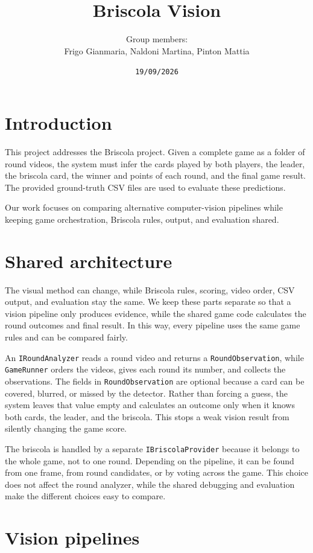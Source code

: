 \documentclass[11pt,a4paper]{article}
\title{Briscola Vision}
\author{Group members: \\ Frigo Gianmaria, Naldoni Martina, Pinton Mattia}
\date{\texttt{19/09/2026}}
\begin{document}
\maketitle

\section{Introduction}

This project addresses the Briscola project.
Given a complete game as a folder of round videos, the system must infer the
cards played by both players, the leader, the briscola card, the winner and
points of each round, and the final game result. The provided ground-truth CSV
files are used to evaluate these predictions.

Our work focuses on comparing alternative computer-vision pipelines while
keeping game orchestration, Briscola rules, output, and evaluation shared.

\section{Shared architecture}

The visual method can change, while Briscola rules, scoring, video order, CSV
output, and evaluation stay the same. We keep these parts separate so that a
vision pipeline only produces evidence, while the shared game code calculates
the round outcomes and final result. In this way, every pipeline uses the same
game rules and can be compared fairly.

An \texttt{IRoundAnalyzer} reads a round video and returns a
\texttt{RoundObservation}, while \texttt{GameRunner} orders the videos, gives
each round its number, and collects the observations. The fields in
\texttt{RoundObservation} are optional because a card can be covered, blurred,
or missed by the detector. Rather than forcing a guess, the system leaves that
value empty and calculates an outcome only when it knows both cards, the
leader, and the briscola. This stops a weak vision result from silently
changing the game score.

The briscola is handled by a separate \texttt{IBriscolaProvider} because it
belongs to the whole game, not to one round. Depending on the pipeline, it can
be found from one frame, from round candidates, or by voting across the game.
This choice does not affect the round analyzer, while the shared debugging and
evaluation make the different choices easy to compare.

\section{Vision pipelines}
\end{document}
